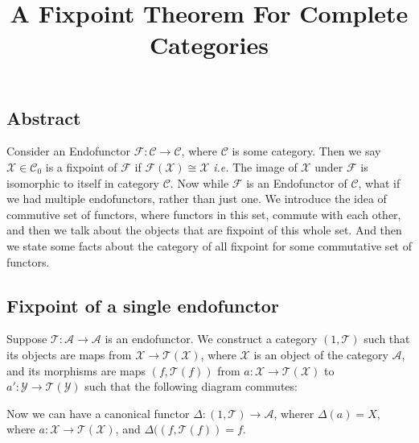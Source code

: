 \documentclass[12pt]{article}
\title{A Fixpoint Theorem For Complete Categories}
\newcounter{the}
\begin{document}
\maketitle
\subsection*{Abstract} 
Consider an Endofunctor $\mathscr F: \mathscr C \to \mathscr C$, where $\mathscr C$ is some category. Then we say $\mathscr X \in \mathscr C_0$ is a fixpoint of $\mathscr F$ if $\mathscr F (\mathscr X) \cong \mathscr X$ \textit{i.e.} The image of $\mathscr X$ under $\mathscr F$ is isomorphic to itself in category $\mathscr C$. Now while $\mathscr F$ is an Endofunctor of $\mathscr C$, what if we had multiple endofunctors, rather than just one. We introduce the idea of commutive set of functors, where functors in this set, commute with each other, and then we talk about the objects that are fixpoint of this whole set. And then we state some facts about the category of all fixpoint for some commutative set of functors.

\subsection*{Fixpoint of a single endofunctor}
Suppose $\mathscr T: \mathscr A \to \mathscr A$ is an endofunctor. We construct a category $(1, \mathscr T)$ such that its objects are maps from $\mathscr X \to \mathscr T( \mathscr X)$, where $\mathscr X$ is an object of the category $\mathscr A$, and its morphisms are maps $(f, \mathscr T(f))$ from $a: \mathscr X \to \mathscr T(\mathscr X)$ to $a': \mathscr Y \to \mathscr T (\mathscr Y)$ such that the following diagram commutes:
\begin{center}
\end{center}
Now we can have a canonical functor $\Delta : (1, \mathscr T) \to \mathscr A$, wherer $\Delta(a) = X$, where $a: \mathscr X \to \mathscr T(\mathscr X)$, and $\Delta ((f, \mathscr T(f)) = f$. 
\end{document}
